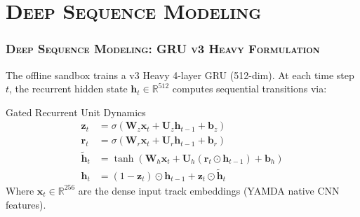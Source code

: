 \documentclass[aspectratio=169,10pt]{beamer}
\begin{document}
\section{\textsc{Deep Sequence Modeling}}
\begin{frame}
  \frametitle{\textsc{Deep Sequence Modeling: GRU v3 Heavy Formulation}}

  The offline sandbox trains a v3 Heavy 4-layer GRU (512-dim). At each time step $t$, the recurrent hidden state $\mathbf{h}_t \in \mathbb{R}^{512}$ computes sequential transitions via:

  \vspace{3mm}
  \begin{block}{Gated Recurrent Unit Dynamics}
    \fontsize{8pt}{10pt}\selectfont
    \begin{align}
        \mathbf{z}_t &= \sigma(\mathbf{W}_z \mathbf{x}_t + \mathbf{U}_z \mathbf{h}_{t-1} + \mathbf{b}_z) \\
        \mathbf{r}_t &= \sigma(\mathbf{W}_r \mathbf{x}_t + \mathbf{U}_r \mathbf{h}_{t-1} + \mathbf{b}_r) \\
        \tilde{\mathbf{h}}_t &= \tanh(\mathbf{W}_h \mathbf{x}_t + \mathbf{U}_h (\mathbf{r}_t \odot \mathbf{h}_{t-1}) + \mathbf{b}_h) \\
        \mathbf{h}_t &= (1 - \mathbf{z}_t) \odot \mathbf{h}_{t-1} + \mathbf{z}_t \odot \tilde{\mathbf{h}}_t
    \end{align}
    Where $\mathbf{x}_t \in \mathbb{R}^{256}$ are the dense input track embeddings (YAMDA native CNN features).
  \end{block}
\end{frame}
\end{document}
